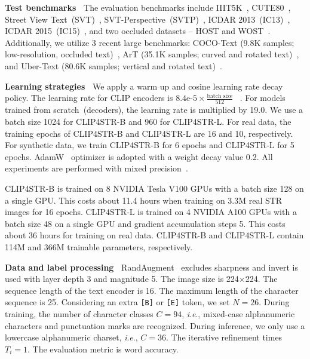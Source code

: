 \documentclass[lettersize,journal]{IEEEtran}
\newcommand{\ie}{\textit{i}.\textit{e}.}
\begin{document}
\noindent
\textbf{Test benchmarks~}
The evaluation benchmarks include IIIT5K~\cite{2012_IIT5k},
CUTE80~\cite{2014_cute80},
Street View Text~(SVT)~\cite{2011_wang_svt},
SVT-Perspective~(SVTP)~\cite{2013_phan_svtp},
ICDAR 2013~(IC13)~\cite{2013_ic13},
ICDAR 2015~(IC15)~\cite{2015_karatzas_ic15},
and two occluded datasets -- HOST and WOST~\cite{2021_wang_ost}.
Additionally, we utilize 3 recent large 
benchmarks: COCO-Text (9.8K
samples; low-resolution, occluded text)~\cite{2016_andreas_cocotext},
ArT (35.1K samples; curved and
rotated text)~\cite{2019_icdar_art},
and Uber-Text (80.6K samples; vertical and rotated text)~\cite{zhang2017uber}.

\noindent
\textbf{Learning strategies~}
We apply a warm up and
cosine learning rate decay policy.
The learning rate for CLIP encoders is $\text{8.4e-5}\times\frac{\text{batch size}}{512}$~\cite{2017_goyal_accurate} .
For models trained from scratch~(decoders), the learning rate is multiplied by 19.0.
We use a batch size 1024 for CLIP4STR-B and 960 for CLIP4STR-L.
For real data, the training epochs of CLIP4STR-B and CLIP4STR-L are 16 and 10, respectively.
For synthetic data, we train CLIP4STR-B for 6 epochs and CLIP4STR-L for 5 epochs.
AdamW~\cite{2019_ilya_adamw} optimizer is adopted with
a weight decay value 0.2.
All experiments are performed with mixed precision~\cite{2018_iclr_amp}.

CLIP4STR-B is trained on 8 NVIDIA Tesla V100 GPUs with a batch size 128 on a single GPU.
This costs about 11.4 hours when training on 3.3M real STR images for 16 epochs.
CLIP4STR-L is trained on 4 NVIDIA A100 GPUs with a batch size 48 on a single GPU and gradient accumulation steps 5.
This costs about 36 hours for training on real data.
CLIP4STR-B and CLIP4STR-L contain 114M and 366M trainable parameters, respectively.

\noindent
\textbf{Data and label processing~}
RandAugment~\cite{2020_ekin_randaug} excludes sharpness and invert is used
with layer depth 3 and magnitude 5.
The image size is 224$\times$224.
The sequence length of the text encoder is 16.
The maximum length of the character sequence is 25.
Considering an extra \texttt{[B]} or \texttt{[E]} token, we set $N=26$.
During training, the number of character classes $C=94$, \ie,
mixed-case alphanumeric characters and punctuation marks are recognized.
During inference, we only use a lowercase alphanumeric charset, \ie, $C=36$. The iterative refinement times $T_i=1$.
The evaluation metric is word accuracy.
\end{document}
